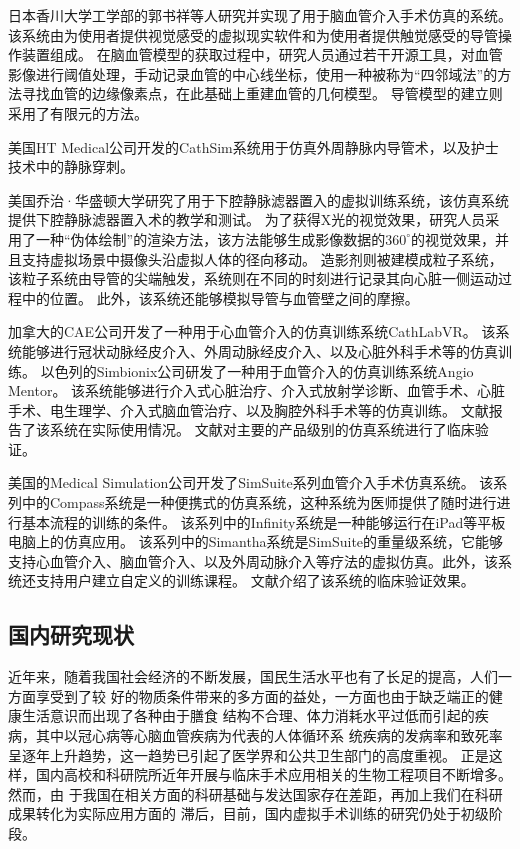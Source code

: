 日本香川大学工学部的郭书祥等人研究并实现了用于脑血管介入手术仿真的系统\cite{Gao2012aGUO}\cite{Gao2012bGUO}\cite{Gao2012cGUO}。
该系统由为使用者提供视觉感受的虚拟现实软件和为使用者提供触觉感受的导管操作装置组成\cite{Gao2012aGUO}。
在脑血管模型的获取过程中，研究人员通过若干开源工具，对血管影像进行阈值处理，手动记录血管的中心线坐标，使用一种被称为“四邻域法”的方法寻找血管的边缘像素点，在此基础上重建血管的几何模型\cite{Gao2012bGUO}。
导管模型的建立则采用了有限元的方法\cite{Gao2012cGUO}。

美国HT Medical公司开发的CathSim系统用于仿真外周静脉内导管术\cite{ursino1999cathsim}，以及护士技术中的静脉穿刺\cite{Barker1999CathSim}。

美国乔治·华盛顿大学研究了用于下腔静脉滤器置入的虚拟训练系统\cite{Hahn1998GWU}，该仿真系统提供下腔静脉滤器置入术的教学和测试。
为了获得X光的视觉效果，研究人员采用了一种“伪体绘制”的渲染方法\cite{Park1996GWU}，该方法能够生成影像数据的$360^\circ$的视觉效果，并且支持虚拟场景中摄像头沿虚拟人体的径向移动。
造影剂则被建模成粒子系统，该粒子系统由导管的尖端触发，系统则在不同的时刻进行记录其向心脏一侧运动过程中的位置\cite{Hahn1998GWU}。
此外，该系统还能够模拟导管与血管壁之间的摩擦\cite{Hahn1998GWU}。

加拿大的CAE公司\cite{caeweb}开发了一种用于心血管介入的仿真训练系统CathLabVR。
该系统能够进行冠状动脉经皮介入、外周动脉经皮介入、以及心脏外科手术等的仿真训练。
以色列的Simbionix公司\cite{simbionixweb}研发了一种用于血管介入的仿真训练系统Angio Mentor。
该系统能够进行介入式心脏治疗、介入式放射学诊断、血管手术、心脏手术、电生理学、介入式脑血管治疗、以及胸腔外科手术等的仿真训练。
文献\cite{hislop2009Simbionix}\cite{Lee2012Simbionix}报告了该系统在实际使用情况。
文献\cite{Petri2013Comparison}对主要的产品级别的仿真系统进行了临床验证。

美国的Medical Simulation公司开发了SimSuite\cite{simsuiteweb}系列血管介入手术仿真系统。
该系列中的Compass系统是一种便携式的仿真系统，这种系统为医师提供了随时进行进行基本流程的训练的条件。
该系列中的Infinity系统是一种能够运行在iPad等平板电脑上的仿真应用。
该系列中的Simantha系统是SimSuite的重量级系统，它能够支持心血管介入、脑血管介入、以及外周动脉介入等疗法的虚拟仿真。此外，该系统还支持用户建立自定义的训练课程。
文献\cite{Dawson2007SimSuite}介绍了该系统的临床验证效果。

\subsection{国内研究现状}
\label{sec1-4-2}

近年来，随着我国社会经济的不断发展，国民生活水平也有了长足的提高，人们一方面享受到了较
好的物质条件带来的多方面的益处，一方面也由于缺乏端正的健康生活意识而出现了各种由于膳食
结构不合理、体力消耗水平过低而引起的疾病，其中以冠心病等心脑血管疾病为代表的人体循环系
统疾病的发病率和致死率呈逐年上升趋势，这一趋势已引起了医学界和公共卫生部门的高度重视。
正是这样，国内高校和科研院所近年开展与临床手术应用相关的生物工程项目不断增多。然而，由
于我国在相关方面的科研基础与发达国家存在差距，再加上我们在科研成果转化为实际应用方面的
滞后，目前，国内虚拟手术训练的研究仍处于初级阶段。

